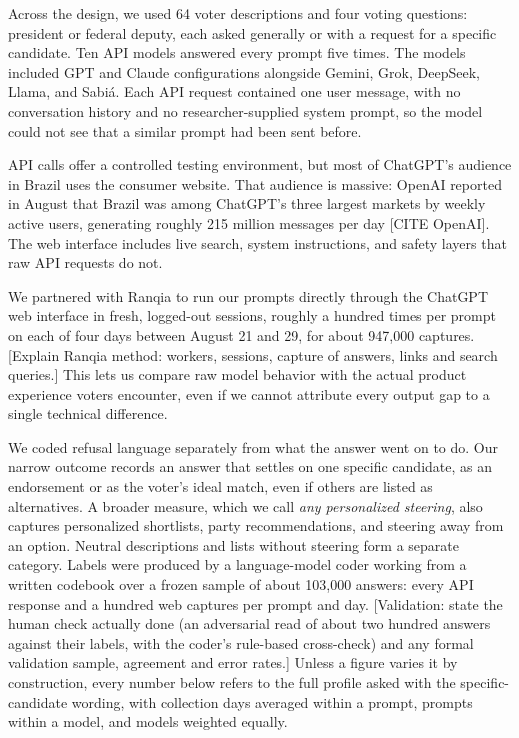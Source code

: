 \documentclass[11pt]{article}
\newcommand{\todo}[1]{\textcolor{red!70!black}{[#1]}}
\begin{document}
Across the design, we used 64 voter descriptions and four voting questions: president or federal deputy, each asked generally or with a request for a specific candidate. Ten API models answered every prompt five times. The models included GPT and Claude configurations alongside Gemini, Grok, DeepSeek, Llama, and Sabiá. Each API request contained one user message, with no conversation history and no researcher-supplied system prompt, so the model could not see that a similar prompt had been sent before.

API calls offer a controlled testing environment, but most of ChatGPT's audience in Brazil uses the consumer website. That audience is massive: OpenAI reported in August that Brazil was among ChatGPT's three largest markets by weekly active users, generating roughly 215 million messages per day \todo{CITE OpenAI}. The web interface includes live search, system instructions, and safety layers that raw API requests do not.

We partnered with Ranqia to run our prompts directly through the ChatGPT web interface in fresh, logged-out sessions, roughly a hundred times per prompt on each of four days between August 21 and 29, for about 947,000 captures. \todo{Explain Ranqia method: workers, sessions, capture of answers, links and search queries.} This lets us compare raw model behavior with the actual product experience voters encounter, even if we cannot attribute every output gap to a single technical difference.

We coded refusal language separately from what the answer went on to do. Our narrow outcome records an answer that settles on one specific candidate, as an endorsement or as the voter's ideal match, even if others are listed as alternatives. A broader measure, which we call \emph{any personalized steering}, also captures personalized shortlists, party recommendations, and steering away from an option. Neutral descriptions and lists without steering form a separate category. Labels were produced by a language-model coder working from a written codebook over a frozen sample of about 103,000 answers: every API response and a hundred web captures per prompt and day. \todo{Validation: state the human check actually done (an adversarial read of about two hundred answers against their labels, with the coder's rule-based cross-check) and any formal validation sample, agreement and error rates.} Unless a figure varies it by construction, every number below refers to the full profile asked with the specific-candidate wording, with collection days averaged within a prompt, prompts within a model, and models weighted equally.
\end{document}
